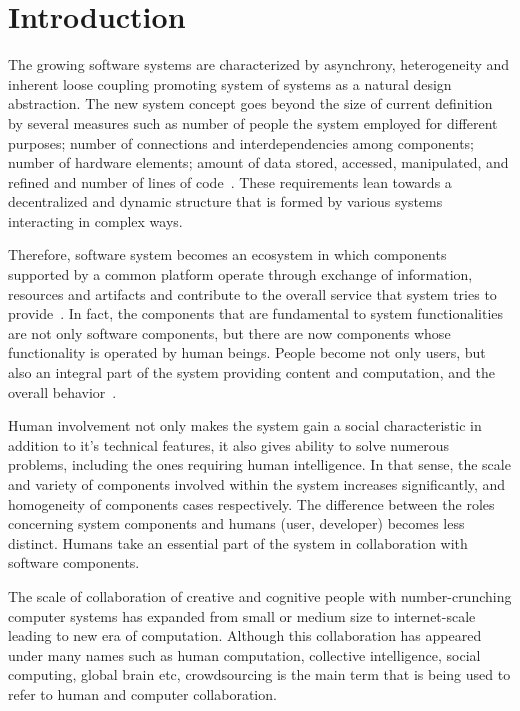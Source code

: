 \chapter{Introduction} 


The growing software systems are characterized by asynchrony, 
heterogeneity and inherent loose coupling promoting system of systems 
as a natural design abstraction. The new system concept goes beyond 
the size of current definition by several measures such as 
number of people the system employed for different purposes; 
number of connections and interdependencies among components; 
number of hardware elements; 
amount of data stored, accessed, manipulated, and refined 
and number of lines of code~\cite{ULSReport}. These requirements lean 
towards a decentralized and dynamic structure that is formed by various 
systems interacting in complex ways.

Therefore, software system becomes an ecosystem in which components supported by 
a common platform operate through exchange of information, resources and 
artifacts and contribute to the overall service that system tries to provide~\cite{Ecosystem}. 
In fact, the components that are fundamental to system 
functionalities are not only software components, but there are now components 
whose functionality is operated by human beings. People become not only users, 
but also an integral part of the system providing 
content and computation, and the overall behavior~\cite{ULSReport}.

Human involvement not only makes the system gain a social characteristic 
in addition to it's technical features, it also gives ability to solve numerous 
problems, including the ones requiring human intelligence. In that sense, the scale 
and variety of components involved within the system increases significantly, and 
homogeneity of components cases respectively. The difference between 
the roles concerning system components and 
humans (user, developer) becomes less distinct. Humans take an essential 
part of the system in collaboration with software components.

The scale of collaboration of creative and cognitive people with 
number-crunching computer systems has expanded from small or 
medium size to internet-scale~\cite{Dorn2012b} leading to new era of 
computation. Although this collaboration has appeared under many names 
such as human computation, collective intelligence, social computing, 
global brain etc, crowdsourcing is the main term that is being used to refer to 
human and computer collaboration.

